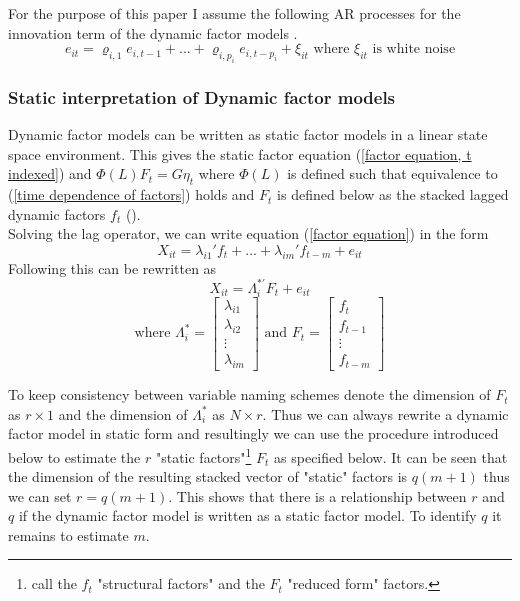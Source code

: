 \documentclass[12pt]{article}
\begin{document}
For the purpose of this paper I assume the following AR processes for the innovation term of the dynamic factor models \citep{breitung2011testing}.
\begin{equation}
	\label{AR process innovation term}
	e_{it} = \varrho_{i,1} e_{i, t-1} + ... + \varrho_{i, p_i} e_{i, t-p_i} + \xi_{it} \text{ where $\xi_{it}$ is white noise}
\end{equation}


\subsubsection{Static interpretation of Dynamic factor models}
Dynamic factor models can be written as static factor models in a linear state space environment. This gives the static factor equation (\ref{factor equation, t indexed}) and $\Phi(L) F_t = G \eta_t$ where $\Phi(L)$ is defined such that equivalence to (\ref{time dependence of factors}) holds and $F_t$ is defined below as the stacked lagged dynamic factors $f_t$ (\citet{stock2011dynamic}). \\

Solving the lag operator, we can write equation (\ref{factor equation}) in the form 
\begin{equation}
	\label{factor equation, solved lag polynomial}
	X_{it} = \lambda_{i1}' f_t + ... + \lambda_{im}' f_{t-m} + e_{it}
\end{equation}
Following \citet{bai2002determining} this can be rewritten as 
$$X_{it} = \Lambda_i^{*'} F_t + e_{it}$$
$$\text{where } \Lambda_i^* = \begin{bmatrix} \lambda_{i1} \\ \lambda_{i2} \\ \vdots \\ \lambda_{im} \end{bmatrix} \text{ and } F_t = \begin{bmatrix} f_t \\ f_{t-1} \\ \vdots \\ f_{t-m} \end{bmatrix}$$

To keep consistency between variable naming schemes denote the dimension of $F_t$ as $r \times 1$ and the dimension of $\Lambda_i^*$ as $N \times r$. Thus we can always rewrite a dynamic factor model in static form and resultingly we can use the procedure introduced below to estimate the $r$ "static factors"\footnote{\citet{breitung2004identification} call the $f_t$ "structural factors" and the $F_t$ "reduced form" factors.} $F_t$ as specified below.
It can be seen that the dimension of the resulting stacked vector of "static" factors is $q(m+1)$ thus we can set $r=q(m+1)$. This shows that there is a relationship between $r$ and $q$ if the dynamic factor model is written as a static factor model. To identify $q$ it remains to estimate $m$.
\end{document}
